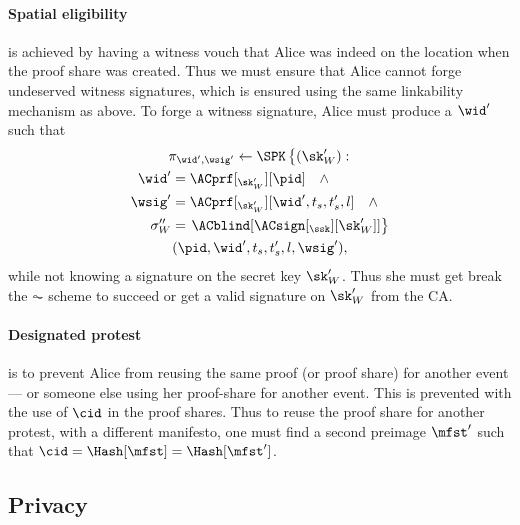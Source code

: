 \paragraph{Spatial eligibility}%
\label{analysis-spatial}

 is achieved by having a witness vouch that Alice was 
indeed on the location when the proof share was created.
Thus we must ensure that Alice cannot forge undeserved witness signatures, which 
is ensured using the same linkability mechanism as above.
To forge a witness signature, Alice must produce a \(\wid'\) such that
\begin{multline*}
  \pi_{\wid', \wsig'}\gets \SPK\left\{ (\sk_W') : \right. \\
    \begin{aligned}
      \wid' &= \ACprf[_{\sk_W'}][\pid] \quad \land \\
      \wsig' &= \ACprf[_{\sk_W'}][\wid', t_s, t_s', l] \quad \land \\
      \sigma_W'' &= \left. \ACblind[\ACsign[_{\ssk}][\sk_W']] \right\}
    \end{aligned} \\
      (\pid, \wid', t_s, t_s', l, \wsig'),
\end{multline*}
while not knowing a signature on the secret key \(\sk_W'\).
Thus she must get break the \(\AC\) scheme to succeed or get a valid signature 
on \(\sk_W'\) from the \ac{CA}.

\paragraph{Designated protest}%
\label{analysis-designated}

 is to prevent Alice from reusing the same proof (or proof 
share) for another event --- or someone else using her proof-share for another 
event.
This is prevented with the use of \(\cid\) in the proof shares.
Thus to reuse the proof share for another protest, with a different manifesto, 
one must find a second preimage \(\mfst'\) such that \(\cid = \Hash[\mfst] = 
  \Hash[\mfst']\).

%
%

\subsection{Privacy}

